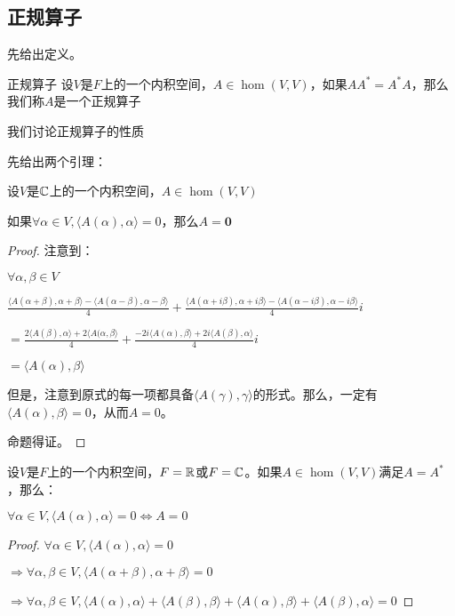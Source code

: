\documentclass[12pt, a4paper, oneside, UTF8]{ctexbook}
\begin{document}
		\subsection{正规算子}
			先给出定义。
			\begin{defn}{正规算子}{}
				设$V$是$F$上的一个内积空间，$A \in \hom(V,V)$，如果$AA^*=A^*A$，那么我们称$A$是一个正规算子
			\end{defn}
			我们讨论正规算子的性质
			\begin{para}{0}
				\point{}
					先给出两个引理：
					\begin{lemma}{}
						设$V$是$\mathbb{C}$上的一个内积空间，$A \in \hom(V,V)$
						
						如果$\forall \alpha \in V,\langle A(\alpha ),\alpha  \rangle =0$，那么$A=\mathbf{0}$
					\end{lemma}
					\begin{proof}
						注意到：

						$\forall \alpha ,\beta \in V$

						$\frac{\langle A(\alpha +\beta ),\alpha +\beta \rangle -\langle A(\alpha -\beta ),\alpha -\beta \rangle}{4}+\frac{\langle A(\alpha + i\beta ),\alpha + i\beta \rangle -\langle A(\alpha - i\beta ),\alpha - i\beta \rangle}{4}i$
					
						$=\frac{2\langle A(\beta ),\alpha\rangle +2\langle A(\alpha,\beta \rangle}{4}+\frac{-2i\langle A(\alpha),\beta \rangle +2i\langle A(\beta ),\alpha\rangle}{4}i$

						$=\langle A(\alpha) ,\beta \rangle$

						但是，注意到原式的每一项都具备$\langle A(\gamma ),\gamma  \rangle$的形式。那么，一定有$\langle A(\alpha) ,\beta \rangle=0$，从而$A=0$。

						命题得证。
					\end{proof}
					\begin{lemma}{}
						设$V$是$F$上的一个内积空间，$F=\mathbb{R}$或$F=\mathbb{C}$。如果$A \in \hom(V,V)$满足$A=A^*$，那么：

						$\forall \alpha \in V ,\langle A(\alpha ),\alpha \rangle = 0 \Leftrightarrow A=0$
					\end{lemma}
					\begin{proof}
						$\forall \alpha \in V ,\langle A(\alpha ),\alpha \rangle = 0$

						$\Rightarrow \forall \alpha ,\beta \in V,\langle A(\alpha+\beta ),\alpha + \beta \rangle =0$

						$\Rightarrow \forall \alpha ,\beta \in V,\langle A(\alpha ),\alpha \rangle + \langle A(\beta ),\beta \rangle + \langle A(\alpha ),\beta \rangle + \langle A(\beta ),\alpha \rangle =0$


\end{proof}
\end{para}
\end{document}
